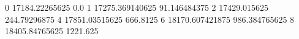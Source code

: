 0 17184.22265625 0.0
1 17275.369140625 91.146484375
2 17429.015625 244.79296875
4 17851.03515625 666.8125
6 18170.607421875 986.384765625
8 18405.84765625 1221.625
